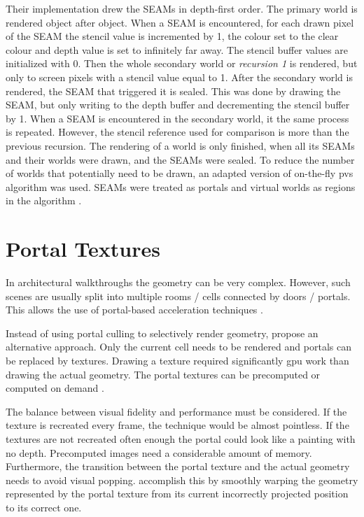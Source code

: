 Their implementation drew the SEAMs in depth-first order. The primary world is rendered object after object. When a SEAM is encountered, for each drawn pixel of the SEAM the stencil value is incremented by 1, the colour set to the clear colour and depth value is set to infinitely far away. The stencil buffer values are initialized with 0. Then the whole secondary world or \textit{recursion 1} is rendered, but only to screen pixels with a stencil value equal to 1. After the secondary world is rendered, the SEAM that triggered it is sealed. This was done by drawing the SEAM, but only writing to the depth buffer and decrementing the stencil buffer by 1. When a SEAM is encountered in the secondary world, it the same process is repeated. However, the stencil reference used for  comparison is more than the previous recursion. The rendering of a world is only finished, when all its SEAMs and their worlds were drawn, and the SEAMs were sealed. To reduce the number of worlds that potentially need to be drawn, an adapted version of \textcite{luebke:1995:portals} on-the-fly \gls{pvs} algorithm was used. SEAMs were treated as portals and virtual worlds as regions in the algorithm \cite{schmalstieg:1999:sewing}.

\section{Portal Textures}
In architectural walkthroughs the geometry can be very complex. However, such scenes are usually split into multiple rooms / cells connected by doors / portals. This allows the use of portal-based acceleration techniques \cite{aliaga:1997:architectural}.

Instead of using portal culling to selectively render geometry, \textcite{aliaga:1997:architectural} propose an alternative approach. Only the current cell needs to be rendered and portals can be replaced by textures. Drawing a texture required significantly \gls{gpu} work than drawing the actual geometry. The portal textures can be precomputed or computed on demand \cite{aliaga:1997:architectural}. 

The balance between visual fidelity and performance must be considered. If the texture is recreated every frame, the technique would be almost pointless. If the textures are not recreated often enough the portal could look like a painting with no depth. Precomputed images need a considerable amount of memory. Furthermore, the transition between the portal texture and the actual geometry needs to avoid visual popping. \textcite{aliaga:1997:architectural} accomplish this by smoothly warping the geometry represented by the portal texture from its current incorrectly projected position to its correct one.

